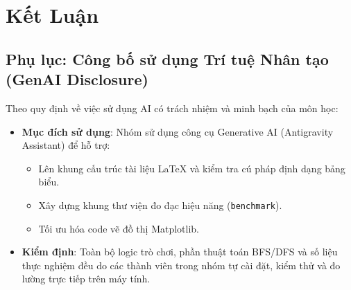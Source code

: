 \chapter{Kết Luận}

\newpage


\section{Phụ lục: Công bố sử dụng Trí tuệ Nhân tạo (GenAI Disclosure)}
Theo quy định về việc sử dụng AI có trách nhiệm và minh bạch của môn học:
\begin{itemize}
    \item \textbf{Mục đích sử dụng}: Nhóm sử dụng công cụ Generative AI (Antigravity Assistant) để hỗ trợ:
    \begin{itemize}
        \item Lên khung cấu trúc tài liệu LaTeX và kiểm tra cú pháp định dạng bảng biểu.
        \item Xây dựng khung thư viện đo đạc hiệu năng (\texttt{benchmark}).
        \item Tối ưu hóa code vẽ đồ thị Matplotlib.
    \end{itemize}
    \item \textbf{Kiểm định}: Toàn bộ logic trò chơi, phần thuật toán BFS/DFS và số liệu thực nghiệm đều do các thành viên trong nhóm tự cài đặt, kiểm thử và đo lường trực tiếp trên máy tính.
\end{itemize}


